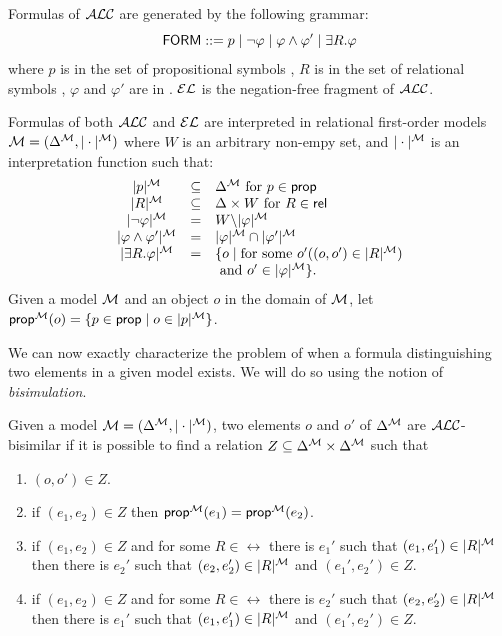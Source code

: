 \begin{definition}
Formulas of $\mathcal{ALC}$ are generated by the following grammar:
$$
\textsf{FORM} ::= p \mid \neg \varphi \mid \varphi \wedge \varphi' \mid \exists R. \varphi
$$
where $p$ is in the set of propositional symbols \prop, $R$ is in the set of relational symbols \rel, $\varphi$ and $\varphi'$ are in \form. $\mathcal{EL}$ is the
negation-free fragment of $\mathcal{ALC}$.

Formulas of both $\mathcal{ALC}$ and $\mathcal{EL}$ are interpreted in relational first-order models
$\mathcal{M} = (\Delta^{\mathcal{M}},|\cdot|^{\mathcal{M}})$ where $W$ is an arbitrary non-empy set, and $|\cdot|^{\mathcal{M}}$ is an interpretation
function such that:
$$
\begin{array}{ccl}
|p|^{\mathcal{M}} & \subseteq & \Delta^{\mathcal{M}}  \mbox{ for $p \in \textsf{prop}$}\\
|R|^{\mathcal{M}} & \subseteq & \Delta\times W  \mbox{ for $R \in \textsf{rel}$}\\
|\neg \varphi|^{\mathcal{M}} & = & W \backslash |\varphi|^{\mathcal{M}}\\
|\varphi \wedge \varphi'|^{\mathcal{M}} & = & |\varphi|^{\mathcal{M}} \cap |\varphi'|^{\mathcal{M}}\\
|\exists R.\varphi|^{\mathcal{M}} & = & \{o \mid \mbox{for some } o' ((o,o') \in |R|^{\mathcal{M}})\\
& & \mbox{ and } o' \in |\varphi|^{\mathcal{M}} \}.\\
\end{array}
$$
Given a model $\mathcal{M}$ and an object $o$ in the domain of $\mathcal{M}$, let
$\textsf{prop}^{\mathcal{M}}(o) = \{p \in \textsf{prop} \mid o \in |p|^{\mathcal{M}}\}$.
\end{definition}

We can now exactly characterize the problem of when a formula distinguishing two
elements in a given model exists. We will do so using the notion of \emph{bisimulation}.

\begin{definition}
Given a model $\mathcal{M} = (\Delta^{\mathcal{M}},|\cdot|^{\mathcal{M}})$, two elements $o$ and $o'$ of $\Delta^{\mathcal{M}}$ are $\mathcal{ALC}$-bisimilar if it is possible to find a relation $Z \subseteq \Delta^{\mathcal{M}} \times \Delta^{\mathcal{M}}$ such that
\begin{enumerate}
\item $(o,o') \in Z$.
\item if $(e_1, e_2) \in Z$ then $\textsf{prop}^{\mathcal{M}}(e_1) = \textsf{prop}^{\mathcal{M}}(e_2)$.
\item if $(e_1,e_2) \in Z$ and for some $R \in \rel$ there is $e_1'$ such that
$(e_1,e_1') \in |R|^{\mathcal{M}}$ then there is $e_2'$ such that $(e_2,e_2') \in |R|^{\mathcal{M}}$ and
$(e_1',e_2') \in Z$.
\item if $(e_1,e_2) \in Z$ and for some $R \in \rel$ there is $e_2'$ such that
$(e_2,e_2') \in |R|^{\mathcal{M}}$ then there is $e_1'$ such that $(e_1,e_1') \in |R|^{\mathcal{M}}$ and
$(e_1',e_2') \in Z$.
\end{enumerate}
\end{definition}

